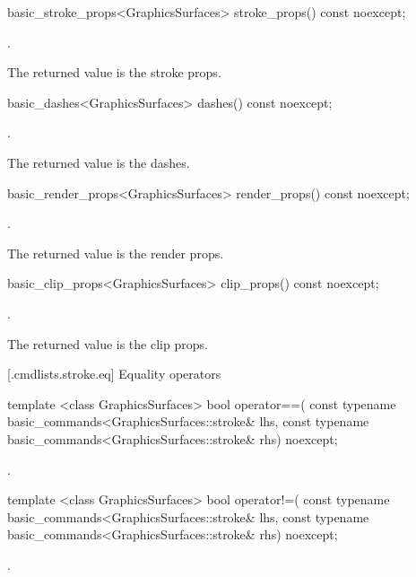 %
\begin{itemdecl}
basic_stroke_props<GraphicsSurfaces> stroke_props() const noexcept;
\end{itemdecl}
\begin{itemdescr}
\pnum
\returns {}.

\pnum
\remarks The returned value is the stroke props.
\end{itemdescr}

%
\begin{itemdecl}
basic_dashes<GraphicsSurfaces> dashes() const noexcept;
\end{itemdecl}
\begin{itemdescr}
\pnum
\returns {}.

\pnum
\remarks The returned value is the dashes.
\end{itemdescr}

%
\begin{itemdecl}
basic_render_props<GraphicsSurfaces> render_props() const noexcept;
\end{itemdecl}
\begin{itemdescr}
\pnum
\returns {}.

\pnum
\remarks The returned value is the render props.
\end{itemdescr}

%
\begin{itemdecl}
basic_clip_props<GraphicsSurfaces> clip_props() const noexcept;
\end{itemdecl}
\begin{itemdescr}
\pnum
\returns {}.

\pnum
\remarks The returned value is the clip props.
\end{itemdescr}

 [\iotwod.cmdlists.stroke.eq] {Equality operators}%

%
\begin{itemdecl}
template <class GraphicsSurfaces>
bool operator==(
  const typename basic_commands<GraphicsSurfaces::stroke& lhs,
  const typename basic_commands<GraphicsSurfaces::stroke& rhs) 
  noexcept;
\end{itemdecl}
\begin{itemdescr}
\pnum
\returns {}.
\end{itemdescr}

%
\begin{itemdecl}
template <class GraphicsSurfaces>
bool operator!=(
  const typename basic_commands<GraphicsSurfaces::stroke& lhs,
  const typename basic_commands<GraphicsSurfaces::stroke& rhs) 
  noexcept;
\end{itemdecl}
\begin{itemdescr}
\pnum
\returns {}.
\end{itemdescr}
